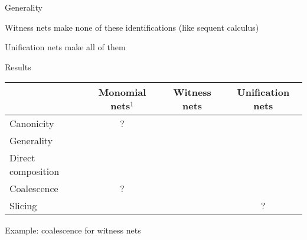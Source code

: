 \documentclass[xcolor=dvipsnames]{beamer}
\makeatletter
\newcommand\+{+}
\renewcommand\*{\times}
\newcommand\dual[1]{\overline{#1}}
\newcommand\seq[2]{{\vdash\,}#1,#2}
\newcommand\xmark{{\color{darkred}\ding{55}}}
\newcommand\vmark{{\color{darkgreen}\ding{51}}}
\newcommand\Qrr{\!\!\scriptstyle\qrr}
\newcommand\qrr[1]{
  \ifx#1+\expandafter\@qrr\else
  \ifx#1*\*\mathrm R\else
  \ifx#1!\forall\mathrm R\else
  \ifx#1?\expandafter\@@qrr\else
  \ifx#11\mathrm{ax}\else
  \ifx#1.\mathrm{cut}\else
  #1\mathrm R
  \fi\fi\fi\fi\fi\fi
}
\newcommand\@qrr[1]{+\mathrm R,#1}
\newcommand\@@qrr[1]{\exists\mathrm R,#1}
\newcommand\xs{(x,\!s)}
\newcommand\xt{(x,\!t)}
\newcommand\xy{(x,\!y)}
\newcommand\zs{(z,\!s)}
\newcommand\zt{(z,\!t)}
\makeatother
\begin{document}
\begin{frame}{Generality}

{\color{darkred}Witness nets} make none of these identifications (like {\color{darkred}sequent calculus})

\bigskip
\bigskip

{\color{darkred}Unification nets} make all of them

\end{frame}
\begin{frame}{Results}

\begin{tabular}{lccc}
 &	Monomial nets$^1$ & Witness nets & Unification nets
\\\hline
   Canonicity          &    ?   & \vmark & \vmark
\\ Generality          & \xmark & \xmark & \vmark
\\ Direct composition  & \xmark & \vmark & \vmark
\\ Coalescence         &    ?   & \vmark & \vmark
\\ Slicing             & \vmark & \vmark &   ?
\end{tabular}  


\end{frame}
\begin{frame}

\begin{center}
Example: coalescence for witness nets
\end{center}

\end{frame}
\end{document}
